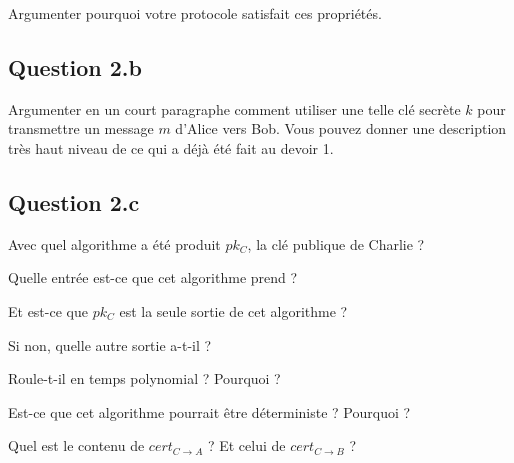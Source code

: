 \documentclass[12pt]{article}
\begin{document}
Argumenter pourquoi votre protocole satisfait ces propriétés.



\subsection{Question 2.b}

Argumenter en un court paragraphe comment utiliser une telle clé secrète $k$ pour transmettre un message $m$ d'Alice vers Bob. Vous pouvez donner une description très haut niveau de ce qui a déjà été fait au devoir 1.



\subsection{Question 2.c}

Avec quel algorithme a été produit $pk_C$, la clé publique de Charlie ?

Quelle entrée est-ce que cet algorithme prend ?

Et est-ce que $pk_C$ est la seule sortie de cet algorithme ? 

Si non, quelle autre sortie a-t-il ?

Roule-t-il en temps polynomial ? Pourquoi ?

Est-ce que cet algorithme pourrait être déterministe ? Pourquoi ?

Quel est le contenu de $cert_{C \rightarrow A}$ ? Et celui de $cert_{C \rightarrow B}$ ?
\end{document}
